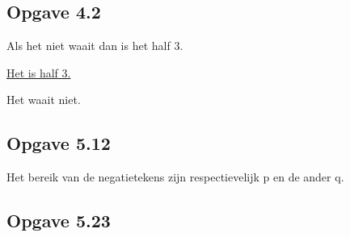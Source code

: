 \documentclass[11pt]{article}
\begin{document}
%

\subsection*{Opgave 4.2}

Als het niet waait dan is het half 3.

\underline{Het is half 3.\quad}

Het waait niet.


\subsection*{Opgave 5.12}


Het bereik van de negatietekens zijn respectievelijk p en de ander q.


\subsection*{Opgave 5.23}
\end{document}
